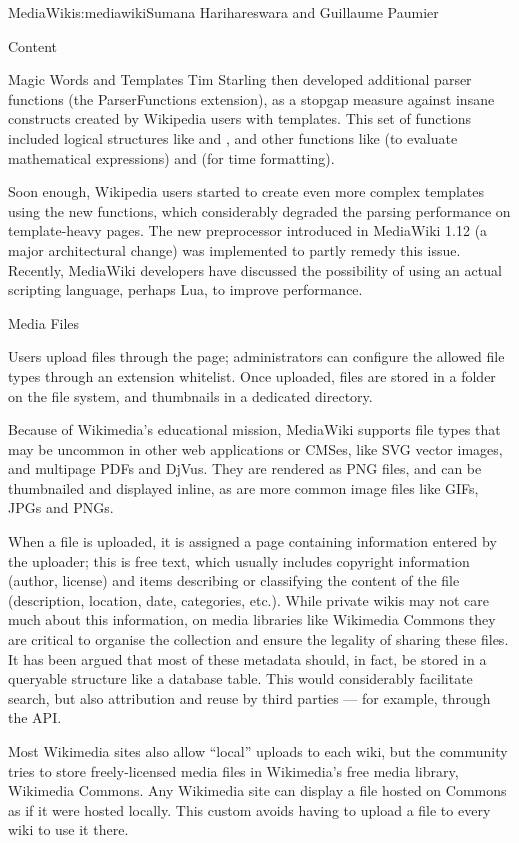 \begin{aosachapter}{MediaWiki}{s:mediawiki}{Sumana Harihareswara and Guillaume Paumier}
\begin{aosasect1}{Content}
\begin{aosasect2}{Magic Words and Templates}
Tim Starling then developed additional parser functions (the
ParserFunctions extension), as a stopgap measure against insane
constructs created by Wikipedia users with templates. This set of
functions included logical structures like  and
, and other functions like  (to evaluate
mathematical expressions) and  (for time formatting).

Soon enough, Wikipedia users started to create even more complex
templates using the new functions, which considerably degraded the
parsing performance on template-heavy pages. The new preprocessor
introduced in MediaWiki 1.12 (a major architectural change) was
implemented to partly remedy this issue. Recently, MediaWiki
developers have discussed the possibility of using an actual scripting
language, perhaps Lua, to improve performance.

\end{aosasect2}

\begin{aosasect2}{Media Files}

Users upload files through the  page;
administrators can configure the allowed file types through an
extension whitelist. Once uploaded, files are stored in a folder on
the file system, and thumbnails in a dedicated  directory.

Because of Wikimedia's educational mission, MediaWiki supports file
types that may be uncommon in other web applications or CMSes, like
SVG vector images, and multipage PDFs and DjVus. They are rendered
as PNG files, and can be thumbnailed and displayed inline, as are more
common image files like GIFs, JPGs and PNGs.

When a file is uploaded, it is assigned a  page containing
information entered by the uploader; this is free text, which usually
includes copyright information (author, license) and items describing
or classifying the content of the file (description, location, date,
categories, etc.). While private wikis may not care much about this
information, on media libraries like Wikimedia Commons they are
critical to organise the collection and ensure the legality of sharing
these files. It has been argued that most of these metadata should, in
fact, be stored in a queryable structure like a database table. This
would considerably facilitate search, but also attribution and reuse
by third parties — for example, through the API.

Most Wikimedia sites also allow ``local'' uploads to each wiki, but the
community tries to store freely-licensed media files in Wikimedia's
free media library, Wikimedia Commons. Any Wikimedia site can display
a file hosted on Commons as if it were hosted locally. This custom
avoids having to upload a file to every wiki to use it there.


\end{aosasect2}
\end{aosasect1}
\end{aosachapter}
